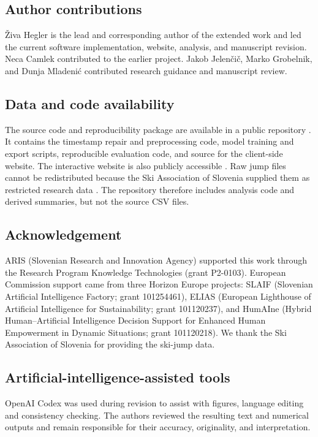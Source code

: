 \documentclass[11pt,twoside,a4paper]{article}
\begin{document}
\subsection*{Author contributions}
Živa Hegler is the lead and corresponding author of the extended work and led the current software implementation, website, analysis, and manuscript revision. Neca Camlek contributed to the earlier project. Jakob Jelenčič, Marko Grobelnik, and Dunja Mladenić contributed research guidance and manuscript review.

\subsection*{Data and code availability}
The source code and reproducibility package are available in a public repository \cite{hegler2026repository}. It contains the timestamp repair and preprocessing code, model training and export scripts, reproducible evaluation code, and source for the client-side website. The interactive website is also publicly accessible \cite{hegler2026website}. Raw jump files cannot be redistributed because the Ski Association of Slovenia supplied them as restricted research data \cite{skiassociation2024planica}. The repository therefore includes analysis code and derived summaries, but not the source CSV files.

\subsection*{Acknowledgement}
{\raggedright
ARIS (Slovenian Research and Innovation Agency) supported this work through the Research Program Knowledge Technologies (grant P2-0103). European Commission support came from three Horizon Europe projects: SLAIF (Slovenian Artificial Intelligence Factory; grant 101254461), ELIAS (European Lighthouse of Artificial Intelligence for Sustainability; grant 101120237), and HumAIne (Hybrid Human--Artificial Intelligence Decision Support for Enhanced Human Empowerment in Dynamic Situations; grant 101120218). We thank the Ski Association of Slovenia for providing the ski-jump data.


\par}

\subsection*{Artificial-intelligence-assisted tools}
OpenAI Codex was used during revision to assist with figures, language editing and consistency checking. The authors reviewed the resulting text and numerical outputs and remain responsible for their accuracy, originality, and interpretation.

\printbibliography[title={References}]
\end{document}
